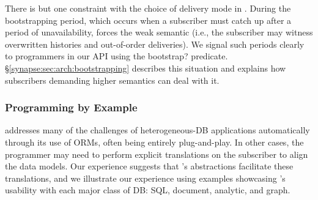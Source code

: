 There is but one constraint with the choice of delivery mode in
\synapse.  During the bootstrapping period, which occurs when a
subscriber must catch up after a period of unavailability, \synapse
forces the weak semantic (i.e., the subscriber may witness overwritten
histories and out-of-order deliveries).  We signal such periods
clearly to programmers in our API using the {\code bootstrap?}
predicate.  \S\ref{synapse:sec:arch:bootstrapping} describes this situation and
explains how subscribers demanding higher semantics can deal with it. 
\subsubsection{\synapse Programming by Example}
\label{synapse:sec:examples}

\synapse addresses many of the challenges of heterogeneous-DB applications automatically through its use of ORMs, often being entirely plug-and-play.
In other cases, the programmer may need to perform explicit translations on the subscriber to align the data models.
Our experience suggests that \synapse's abstractions facilitate these translations, and we illustrate our experience using examples showcasing \synapse's usability with each major class of DB: SQL, document, analytic, and graph.

